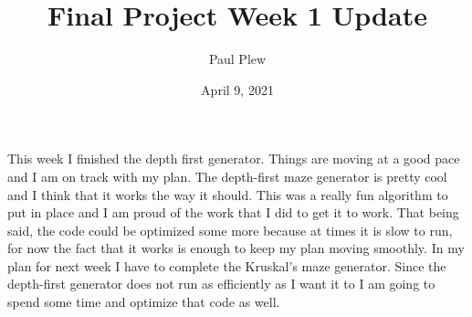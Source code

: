 \documentclass[12 pt]{article}
\title{Final Project Week 1 Update}
\author{Paul Plew}
\date{April 9, 2021}
\begin{document}
\maketitle
\indent This week I finished the depth first generator. Things are moving at a good pace and I am on track with my plan. The depth-first maze generator is pretty cool and I think that it works the way it should. This was a really fun algorithm to put in place and I am proud of the work that I did to get it to work. That being said, the code could be optimized some more because at times it is slow to run, for now the fact that it works is enough to keep my plan moving smoothly. In my plan for next week I have to complete the Kruskal's maze generator. Since the depth-first generator does not run as efficiently as I want it to I am going to spend some time and optimize that code as well. 
\end{document}
